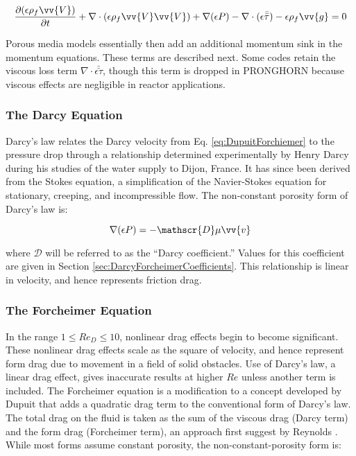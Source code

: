 \documentclass[10pt]{article}
\numberwithin{equation}{section} %
\begin{document}
\begin{equation}
\label{eq:NavierStokesPorous}
\frac{\partial(\epsilon\rho_f\vv{V})}{\partial t}+\nabla\cdot(\epsilon\rho_f\vv{V}\vv{V})+\nabla (\epsilon P)-\nabla\cdot(\epsilon\bar{\bar\tau})-\epsilon\rho_f\vv{g}=0
\end{equation}

Porous media models essentially then add an additional momentum sink in the momentum equations. These terms are described next. Some codes retain the viscous loss term \(\nabla\cdot\bar{\bar{\epsilon\tau}}\), though this term is dropped in PRONGHORN because viscous effects are negligible in reactor applications.

\subsubsection{The Darcy Equation}
\label{sec:Darcy}

Darcy's law relates the Darcy velocity from Eq. \eqref{eq:DupuitForchiemer} to the pressure drop through a relationship determined experimentally by Henry Darcy during his studies of the water supply to Dijon, France. It has since been derived from the Stokes equation, a simplification of the Navier-Stokes equation for stationary, creeping, and incompressible flow. The non-constant porosity form of Darcy's law is:

\begin{equation}
\label{eq:DarcysLaw_NonconstantPorosity2}
\nabla(\epsilon P)=-\mathscr{D}\mu\vv{v}
\end{equation}

where \(\mathscr{D}\) will be referred to as the ``Darcy coefficient.'' Values for this coefficient are given in Section \ref{sec:DarcyForcheimerCoefficients}. This relationship is linear in velocity, and hence represents friction drag. 

\subsubsection{The Forcheimer Equation}
\label{sec:ForcheimerEquation}

In the range \(1\leq Re_D\leq 10\), nonlinear drag effects begin to become significant. These nonlinear drag effects scale as the square of velocity, and hence represent form drag due to movement in a field of solid obstacles. Use of Darcy's law, a linear drag effect, gives inaccurate results at higher \(Re\) unless another term is included. The Forcheimer equation is a modification to a concept developed by Dupuit that adds a quadratic drag term to the conventional form of Darcy's law. The total drag on the fluid is taken as the sum of the viscous drag (Darcy term) and the form drag (Forcheimer term), an approach first suggest by Reynolds \cite{ergun}. While most forms assume constant porosity, the non-constant-porosity form is:
\end{document}
